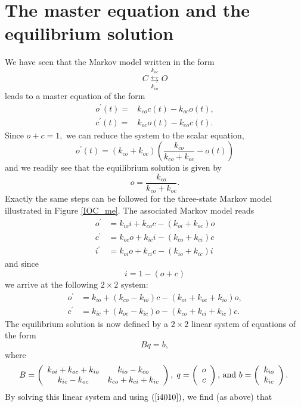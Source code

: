 \section{The master equation and the equilibrium solution \label{me_eq}}

We have seen that the Markov model written in the form
\begin{equation}
C\underset{k_{co}}{\overset{k_{oc}}{\leftrightarrows}}O \label{Markov1010}%
\end{equation}
leads to a master equation of the form 
\begin{align}
o^{\prime}(t)=  &  k_{co}c(t)-k_{oc}o(t),\label{po1010}\\
c^{\prime}(t)=  &  k_{oc}o(t)-k_{co}c(t). \label{pc1010}%
\end{align}
Since $o+c=1,$ we can reduce the system to the scalar equation,%
\[
o^{\prime}(t)=\left(  k_{co}+k_{oc}\right)  \left(  \frac{k_{co}}%
{k_{co}+k_{oc}}-o\left(  t\right)  \right)
\]
and we readily see that the equilibrium solution is given by
\[
o=\frac{k_{co}}{k_{co}+k_{oc}}.
\]
Exactly the same steps can be followed for the three-state Markov model
illustrated in Figure \ref{IOC_me}. The associated Markov model reads
\begin{align*}
o^{\prime} &  =k_{io}i+k_{co}c-\left(  k_{oi}+k_{oc}\right)  o\\
c^{\prime} &  =k_{oc}o+k_{ic}i-\left(  k_{co}+k_{ci}\right)  c\\
i^{\prime} &  =k_{oi}o+k_{ci}c-\left(  k_{io}+k_{ic}\right)  i
\end{align*}
and since
\begin{equation}
i=1-\left(  o+c\right)  \label{i4010}%
\end{equation}
we arrive at the following $2 \times 2$ system:%
\begin{align*}
o^{\prime} &  =k_{io}+\left(  k_{co}-k_{io}\right)  c-\left(  k_{oi}%
+k_{oc}+k_{io}\right)  o,\\
c^{\prime} &  =k_{ic}+\left(  k_{oc}-k_{ic}\right)  o-\left(  k_{co}%
+k_{ci}+k_{ic}\right)  c.
\end{align*}
The equilibrium solution is now defined by a $2 \times 2$ linear system of equations of
the form%
\begin{equation}
Bq=b,\label{i4011}%
\end{equation}
where
\[
B=\left(
\begin{array}
[c]{cc}%
k_{oi}+k_{oc}+k_{io} & k_{io}-k_{co}\\
k_{ic}-k_{oc} & k_{co}+k_{ci}+k_{ic}%
\end{array}
\right)  ,\;q=\left(
\begin{array}
[c]{c}%
o\\
c
\end{array}
\right)  \text{, and }b=\left(
\begin{array}
[c]{c}%
k_{io}\\
k_{ic}%
\end{array}
\right)  .\;
\]
By solving this linear system and using $\left(  \ref{i4010}\right)$, we
find (as above) that%

